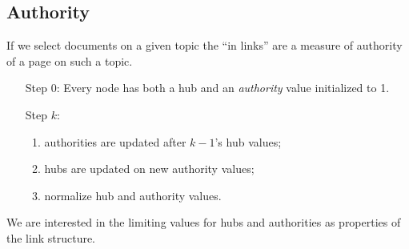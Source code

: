 \documentclass[a4paper,9pt]{extarticle}
\begin{document}
\begin{multicols*}{2}
		\subsection{Authority}
		If we select documents on a given topic the ``in links'' are a measure of authority of a page on such a topic.
		\begin{riquadro}
			\begin{enumerate}
				\item[Step 0:] Every node has both a hub and an \textit{authority} value initialized to 1.
				\item[Step $k$:] \begin{enumerate}
					\item authorities are updated after $k-1$'s hub values;
					\item hubs are updated on new authority values;
					\item normalize hub and authority values.
				\end{enumerate}
			\end{enumerate}
		\end{riquadro}
		We are interested in the limiting values for hubs and authorities as properties of the link structure.

\end{multicols*}
\end{document}
